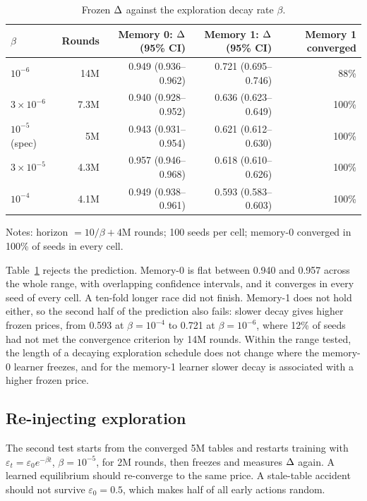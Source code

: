 \begin{table}[htbp]
\centering
\caption{Frozen $\Delta$ against the exploration decay rate $\beta$.}
\label{tab:sweep}
\small
\begin{tabular}{@{}lrrrr@{}}
\toprule
$\beta$ & Rounds & Memory 0: $\Delta$ (95\% CI) & Memory 1: $\Delta$ (95\% CI) & Memory 1 converged \\
\midrule
$10^{-6}$ & 14M & 0.949 (0.936--0.962) & 0.721 (0.695--0.746) & 88\% \\
$3\times 10^{-6}$ & 7.3M & 0.940 (0.928--0.952) & 0.636 (0.623--0.649) & 100\% \\
$10^{-5}$ (spec) & 5M & 0.943 (0.931--0.954) & 0.621 (0.612--0.630) & 100\% \\
$3\times 10^{-5}$ & 4.3M & 0.957 (0.946--0.968) & 0.618 (0.610--0.626) & 100\% \\
$10^{-4}$ & 4.1M & 0.949 (0.938--0.961) & 0.593 (0.583--0.603) & 100\% \\
\bottomrule
\end{tabular}
\par\smallskip
\footnotesize Notes: horizon $= 10/\beta + 4$M rounds; 100 seeds per cell; memory-0 converged in 100\% of seeds in every cell.
\end{table}

Table~\ref{tab:sweep} rejects the prediction. Memory-0 is flat between 0.940 and 0.957 across the whole range, with overlapping confidence intervals, and it converges in every seed of every cell. A ten-fold longer race did not finish. Memory-1 does not hold either, so the second half of the prediction also fails: slower decay gives higher frozen prices, from 0.593 at $\beta = 10^{-4}$ to 0.721 at $\beta = 10^{-6}$, where 12\% of seeds had not met the convergence criterion by 14M rounds. Within the range tested, the length of a decaying exploration schedule does not change where the memory-0 learner freezes, and for the memory-1 learner slower decay is associated with a higher frozen price.

\subsection{Re-injecting exploration}\label{sec:reinject}

The second test starts from the converged 5M tables and restarts training with $\varepsilon_t = \varepsilon_0 e^{-\beta t}$, $\beta = 10^{-5}$, for 2M rounds, then freezes and measures $\Delta$ again. A learned equilibrium should re-converge to the same price. A stale-table accident should not survive $\varepsilon_0 = 0.5$, which makes half of all early actions random.

